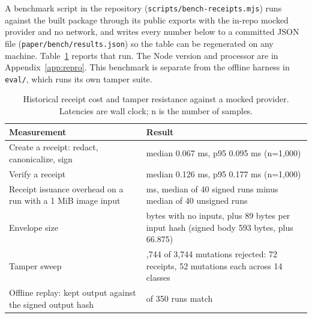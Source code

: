 \documentclass[conference]{IEEEtran}
\newcommand{\code}[1]{\texttt{\small #1}}
\begin{document}
A benchmark script in the repository (\code{scripts/bench-receipts.mjs}) runs
against the built package through its public exports with the in-repo mocked provider
and no network, and writes every number below to a committed JSON file
(\code{paper/bench/results.json}) so the table can be regenerated on any machine.
Table~\ref{tab:bench} reports that run. The Node version and processor are in Appendix~\ref{app:repro}.
This benchmark is separate from the offline harness in \code{eval/}, which runs its own
tamper suite.

\begin{table}[t]
\caption{Historical receipt cost and tamper resistance against a mocked provider.
Latencies are wall clock; n is the number of samples.}
\label{tab:bench}
\centering
\footnotesize
\begin{tabular}{@{}>{\raggedright\arraybackslash}p{44mm}>{\raggedright\arraybackslash}p{40mm}@{}}
\toprule
Measurement & Result \\
\midrule
Create a receipt: redact, canonicalize, sign & median 0.067 ms, p95 0.095 ms (n=1,000) \\
Verify a receipt & median 0.126 ms, p95 0.177 ms (n=1,000) \\
Receipt issuance overhead on a run with a 1 MiB image input & 1.402 ms, median of 40 signed runs minus median of 40 unsigned runs \\
Envelope size & 993 bytes with no inputs, plus 89 bytes per input hash (signed body 593 bytes, plus 66.875) \\
Tamper sweep & 3,744 of 3,744 mutations rejected: 72 receipts, 52 mutations each across 14 classes \\
Offline replay: kept output against the signed output hash & 350 of 350 runs match \\
\bottomrule
\end{tabular}
\end{table}
\end{document}
